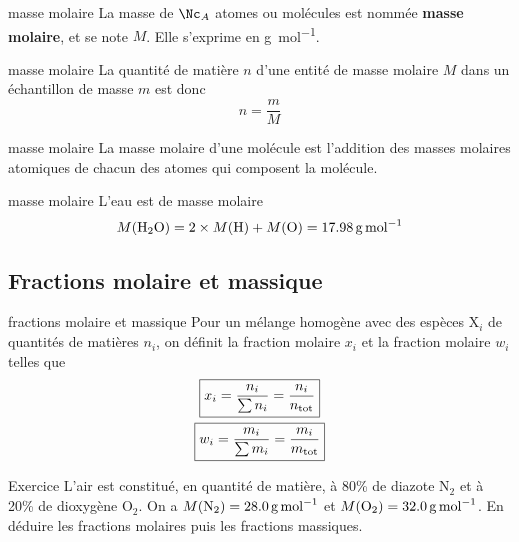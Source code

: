 \documentclass[../main/main.tex]{subfiles}
\begin{document}
\begin{tcbraster}[raster columns=2, raster equal height=rows]
    \begin{defi}[label=massemol]{masse molaire}
        La masse de $\Nc_A$ atomes ou molécules est nommée \textbf{masse
        molaire}, et se note $M$.
        Elle s'exprime en \si{g.mol^{-1}}.
    \end{defi}
    \begin{impl}[label=imple:massemol]{masse molaire}
        La quantité de matière $n$ d'une entité de masse molaire $M$ dans un
        échantillon de masse $m$ est donc
        \[\boxed{n = \frac{m}{M}}\]
    \end{impl}
    \begin{prop}[label=prop:massemol]{masse molaire}
        La masse molaire d'une molécule est l'addition des masses molaires
        atomiques de chacun des atomes qui composent la molécule.
    \end{prop}
    \begin{exem}[label=exem:massemol]{masse molaire}
        L'eau est de masse molaire
        \[M({\rm H}_2{\rm O}) = 2\times M({\rm H}) + M({\rm O}) =
        \SI{17.98}{g.mol^{-1}}\]
    \end{exem}
\end{tcbraster}

\subsection{Fractions molaire et massique}
\begin{tcbraster}[raster columns=2, raster equal height=rows]
    \begin{defi}[label=def:fractionsmolmass]{fractions molaire et massique}
        Pour un mélange homogène avec des espèces $\mathrm{X}_i$ de quantités de matières
        $n_i$, on définit la fraction molaire $x_i$ et la fraction molaire $w_i$
        telles que
        \begin{gather*}
            \boxed{x_i = \frac{n_i}{\sum n_i} = \frac{n_i}{n_{\rm tot}}}\\
            \boxed{w_i = \frac{m_i}{\sum m_i} = \frac{m_i}{m_{\rm tot}}}
        \end{gather*}
    \end{defi}
    \begin{NCexem}[width=\linewidth]{Exercice}
        L'air est constitué, en quantité de matière, à 80\% de diazote N$_2$ et
        à 20\% de dioxygène O$_2$. On a $M({\rm N_2}) = \SI{28.0}{g.mol^{-1}}$
        et $M({\rm O_2}) = \SI{32.0}{g.mol^{-1}}$. En déduire les fractions
        molaires puis les fractions massiques.
        \tcblower
    \end{NCexem}
\end{tcbraster}
\end{document}
